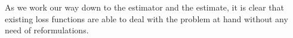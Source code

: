 As we work our way down to the estimator and the estimate, it is clear that existing loss functions are able to deal with the problem at hand without any need of reformulations. 

\cite{multiclassToBinary1}



